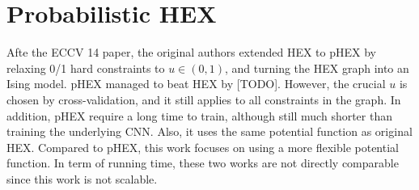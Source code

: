 \documentclass[11pt,a4paper]{article}
\begin{document}
\section{Probabilistic HEX}

Afte the ECCV 14 paper, the original authors extended HEX to pHEX by relaxing 0/1 hard constraints to $u\in(0,1)$, and turning the HEX graph into an Ising model. pHEX managed to beat HEX by [TODO]. However, the crucial $u$ is chosen by cross-validation, and it still applies to all constraints in the graph. In addition, pHEX require a long time to train, although still much shorter than training the underlying CNN. Also, it uses the same potential function as original HEX. Compared to pHEX, this work focuses on using a more flexible potential function. In term of running time, these two works are not directly comparable since this work is not scalable.
\end{document}

